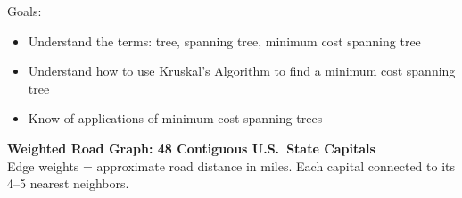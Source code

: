 \documentclass[12pt]{article}
\begin{document}
Goals:
\begin{itemize}
\item Understand the terms: tree, spanning tree, minimum cost spanning tree
\item Understand how to use Kruskal's Algorithm to find a minimum cost spanning tree
\item Know of applications of minimum cost spanning trees
\end{itemize}

\begin{center}
{\large\bfseries Weighted Road Graph: 48 Contiguous U.S.\ State Capitals}\\[2pt]
{\small Edge weights = approximate road distance in miles. Each capital connected to its 4--5 nearest neighbors.}
\end{center}

\vspace{2pt}
\end{document}
